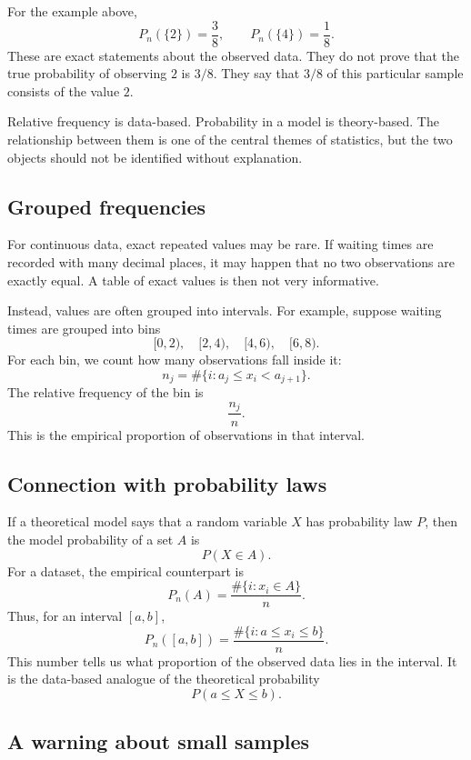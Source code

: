 For the example above,
\[
P_n(\{2\})=\frac38,
\qquad
P_n(\{4\})=\frac18.
\]
These are exact statements about the observed data. They do not prove that the
true probability of observing \(2\) is \(3/8\). They say that \(3/8\) of this
particular sample consists of the value \(2\).

\begin{remarkbox}
Relative frequency is data-based. Probability in a model is theory-based. The
relationship between them is one of the central themes of statistics, but the two
objects should not be identified without explanation.
\end{remarkbox}

\subsection*{Grouped frequencies}

For continuous data, exact repeated values may be rare. If waiting times are
recorded with many decimal places, it may happen that no two observations are
exactly equal. A table of exact values is then not very informative.

Instead, values are often grouped into intervals. For example, suppose waiting
times are grouped into bins
\[
[0,2),\quad [2,4),\quad [4,6),\quad [6,8).
\]
For each bin, we count how many observations fall inside it:
\[
n_j=\#\{i:a_j\leq x_i<a_{j+1}\}.
\]
The relative frequency of the bin is
\[
\frac{n_j}{n}.
\]
This is the empirical proportion of observations in that interval.

\subsection*{Connection with probability laws}

If a theoretical model says that a random variable \(X\) has probability law
\(P\), then the model probability of a set \(A\) is
\[
P(X\in A).
\]
For a dataset, the empirical counterpart is
\[
P_n(A)=\frac{\#\{i:x_i\in A\}}{n}.
\]
Thus, for an interval \([a,b]\),
\[
P_n([a,b])=\frac{\#\{i:a\leq x_i\leq b\}}{n}.
\]
This number tells us what proportion of the observed data lies in the interval.
It is the data-based analogue of the theoretical probability
\[
P(a\leq X\leq b).
\]

\subsection*{A warning about small samples}

